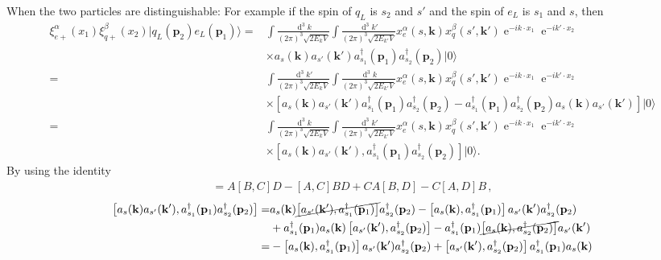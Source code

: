 When the two particles are distinguishable: For example if the spin of $q_L$ is $s_2$ and $s'$ and the spin of $e_L$ is $s_{1}$ and $s$, then %
\begin{align}
  \xi^\alpha_{e+}(x_1)\xi^\beta_{q+}(x_2)|q_L(\mathbf{p}_2)e_L(\mathbf{p}_1)\rangle=&
\int\frac{\operatorname{d}^3k}{(2\pi)^3\sqrt{2E_k V}}\int\frac{\operatorname{d}^3k'}{(2\pi)^3\sqrt{2E_{k'}V}}
x^\alpha_e(s,\mathbf{k})x^\beta_q(s',\mathbf{k}')\operatorname{e}^{-i k\cdot x_1}\operatorname{e}^{-i k'\cdot x_2}\nonumber\\
&\times a_s(\mathbf{k})a_{s'}(\mathbf{k}')a_{s_1}^\dagger(\mathbf{p}_1)a_{s_2}^\dagger(\mathbf{p}_2)|0\rangle \nonumber\\
=&
\int\frac{\operatorname{d}^3k'}{(2\pi)^3\sqrt{2E_k V}}\int\frac{\operatorname{d}^3k}{(2\pi)^3\sqrt{2E_{k'}V}}
x^\alpha_e(s,\mathbf{k})x^\beta_q(s',\mathbf{k}')\operatorname{e}^{-i k\cdot x_1}\operatorname{e}^{-i k'\cdot x_2}\nonumber\\
&\times \left[ a_s(\mathbf{k})a_{s'}(\mathbf{k}')a_{s_1}^\dagger(\mathbf{p}_1)a_{s_2}^\dagger(\mathbf{p}_2) - a_{s_1}^\dagger(\mathbf{p}_1)a_{s_2}^\dagger(\mathbf{p}_2) a_s(\mathbf{k})a_{s'}(\mathbf{k}') \right]|0\rangle \nonumber\\
=&
\int\frac{\operatorname{d}^3k}{(2\pi)^3\sqrt{2E_k V}}\int\frac{\operatorname{d}^3k'}{(2\pi)^3\sqrt{2E_{k'}V}}
x^\alpha_e(s,\mathbf{k})x^\beta_q(s',\mathbf{k}')\operatorname{e}^{-i k\cdot x_1}\operatorname{e}^{-i k'\cdot x_2}\nonumber\\
&\times \left[ a_s(\mathbf{k})a_{s'}(\mathbf{k}'),a_{s_1}^\dagger(\mathbf{p}_1)a_{s_2}^\dagger(\mathbf{p}_2)\right]|0\rangle.
\end{align}
By using the identity
\begin{align}
  [AB,CD]=A[B,C]D - [A,C]BD
+CA[B, D] - C[A, D]B\,,
\end{align}
\begin{align}
   \left[ a_s(\mathbf{k})a_{s'}(\mathbf{k}'),a_{s_1}^\dagger(\mathbf{p}_1)a_{s_2}^\dagger(\mathbf{p}_2)\right]=&
 a_s(\mathbf{k})\cancel{\left[ a_{s'}(\mathbf{k}'),a_{s_1}^\dagger(\mathbf{p}_1)\right]}a_{s_2}^\dagger(\mathbf{p}_2)
-
 \left[ a_s(\mathbf{k}),a_{s_1}^\dagger(\mathbf{p}_1)\right]a_{s'}(\mathbf{k}')a_{s_2}^\dagger(\mathbf{p}_2) \nonumber\\
& 
+a_{s_1}^\dagger(\mathbf{p}_1)a_s(\mathbf{k})\left[ a_{s'}(\mathbf{k}'),a_{s_2}^\dagger(\mathbf{p}_2)\right]
-
a_{s_1}^\dagger(\mathbf{p}_1) \cancel{\left[ a_s(\mathbf{k}),a_{s_2}^\dagger(\mathbf{p}_2)\right]}a_{s'}(\mathbf{k}') \nonumber\\
=&
-
 \left[ a_s(\mathbf{k}),a_{s_1}^\dagger(\mathbf{p}_1)\right]a_{s'}(\mathbf{k}')a_{s_2}^\dagger(\mathbf{p}_2)  
+\left[ a_{s'}(\mathbf{k}'),a_{s_2}^\dagger(\mathbf{p}_2)\right]a_{s_1}^\dagger(\mathbf{p}_1)a_s(\mathbf{k})
\end{align}
